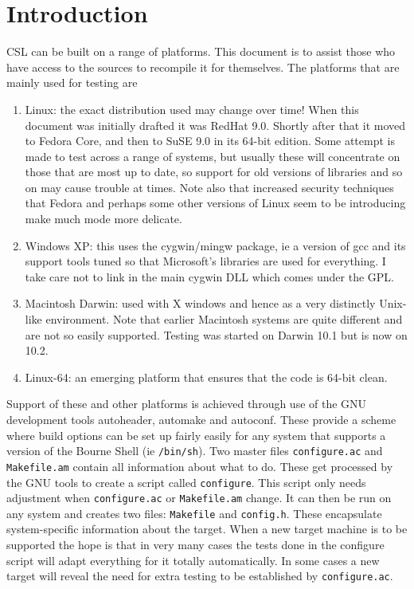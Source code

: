\documentclass[11pt]{article}
\begin{document}
\section{Introduction}
CSL can be built on a range of platforms. This document is to assist those
who have access to the sources to recompile it for themselves.  The platforms
that are mainly used for testing are
\begin{enumerate}
\item Linux: the exact distribution used may change over time! When this
document was initially drafted it was RedHat 9.0. Shortly after that it
moved to Fedora Core, and then to SuSE 9.0 in its 64-bit edition. Some attempt
is made to test across a range of systems, but usually these will concentrate
on those that are most up to date, so support for old versions of libraries
and so on may cause trouble at times. Note also that increased security
techniques that Fedora and perhaps some other versions of Linux seem to
be introducing make much mode more delicate.
\item Windows XP: this uses the cygwin/mingw package, ie a version of gcc and
its support tools tuned so that Microsoft's libraries are used for everything.
I take care not to link in the main cygwin DLL which comes under the GPL.
\item Macintosh Darwin: used with X windows and hence as a very distinctly
Unix-like environment. Note that earlier Macintosh systems are quite different
and are not so easily supported. Testing was started on Darwin 10.1 but
is now on 10.2.
\item Linux-64: an emerging platform that ensures that the code is 64-bit
clean.
\end{enumerate}

Support of these and other platforms is achieved through use of the GNU
development tools autoheader, automake and autoconf. These provide a scheme
where build options can be set up fairly easily for any system that supports
a version of the Bourne Shell (ie \verb+/bin/sh+). Two master files
\verb+configure.ac+ and \verb+Makefile.am+ contain all information
about what to do. These get processed
by the GNU tools to create a script called \verb+configure+. This script only
needs adjustment when \verb+configure.ac+ or \verb+Makefile.am+ change.
It can then be run on any system and creates two files: \verb+Makefile+ and
\verb+config.h+. These
encapsulate system-specific information about the target. When a new
target machine is to be supported the hope is that in very many cases the
tests done in the configure script will adapt everything for it totally
automatically. In some cases a new target will reveal the need for extra
testing to be established by \verb+configure.ac+.
\end{document}

